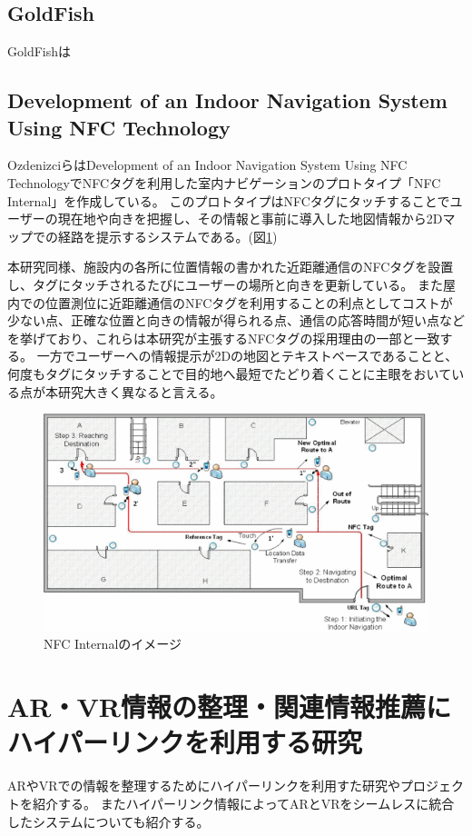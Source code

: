\subsection{GoldFish}
GoldFish\cite{10.1145/2407696.2407699}は

\subsection{Development of an Indoor Navigation System Using NFC Technology}
OzdenizciらはDevelopment of an Indoor Navigation System Using NFC Technology\cite{5954491}でNFCタグを利用した室内ナビゲーションのプロトタイプ「NFC Internal」を作成している。
このプロトタイプはNFCタグにタッチすることでユーザーの現在地や向きを把握し、その情報と事前に導入した地図情報から2Dマップでの経路を提示するシステムである。(図\ref{fig:NFC_Internal})

本研究同様、施設内の各所に位置情報の書かれた近距離通信のNFCタグを設置し、タグにタッチされるたびにユーザーの場所と向きを更新している。
また屋内での位置測位に近距離通信のNFCタグを利用することの利点としてコストが少ない点、正確な位置と向きの情報が得られる点、通信の応答時間が短い点などを挙げており、これらは本研究が主張するNFCタグの採用理由の一部と一致する。
一方でユーザーへの情報提示が2Dの地図とテキストベースであることと、何度もタグにタッチすることで目的地へ最短でたどり着くことに主眼をおいている点が本研究大きく異なると言える。

\begin{figure}[h]
  \centering 
  \includegraphics[width=150mm]{images/NFC_Internal.png}
  \caption{NFC Internalのイメージ} \label{fig:NFC_Internal}
\end{figure}



\section{AR・VR情報の整理・関連情報推薦にハイパーリンクを利用する研究}
ARやVRでの情報を整理するためにハイパーリンクを利用すた研究やプロジェクトを紹介する。
またハイパーリンク情報によってARとVRをシームレスに統合したシステムについても紹介する。



